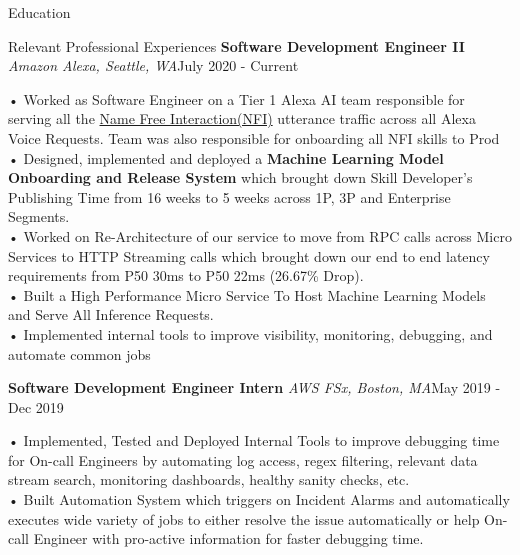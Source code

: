 \documentclass{resume} %
\begin{document}
\begin{rSection}{Education}
\begin{rSection}{Relevant Professional Experiences}
\textbf{Software Development Engineer II } \textit{Amazon Alexa, Seattle, WA}\hfill July 2020 - Current \\
\vspace{-1.7em} \begin{addmargin}[0.5em]{0em}
• Worked as Software Engineer on a Tier 1 Alexa AI team responsible for serving all the \href{https://developer.amazon.com/en-US/docs/alexa/custom-skills/understand-name-free-interaction-for-custom-skills.html}{Name Free Interaction(NFI)} utterance traffic across all Alexa Voice Requests. Team was also responsible for onboarding all NFI skills to Prod\\
• Designed, implemented and deployed a \textbf{Machine Learning Model Onboarding and Release System} which brought down Skill Developer's Publishing Time from 16 weeks to 5 weeks across 1P, 3P and Enterprise Segments. \\
• Worked on Re-Architecture of our service to move from RPC calls across Micro Services to HTTP Streaming calls which brought down our end to end latency requirements from P50 30ms to P50 22ms (26.67\% Drop).\\
• Built a High Performance Micro Service To Host Machine Learning Models and Serve All Inference Requests. \\
• Implemented internal tools to improve visibility, monitoring, debugging, and automate common jobs \\
\end{addmargin} \vspace{-1.7em}
\textbf{Software Development Engineer Intern } \textit{AWS FSx, Boston, MA}\hfill May 2019 - Dec 2019 \\
\vspace{-1.7em} \begin{addmargin}[0.5em]{0em}
• Implemented, Tested and Deployed Internal Tools to improve debugging time for On-call Engineers by automating log access, regex filtering, relevant data stream search, monitoring dashboards, healthy sanity checks, etc. \\
• Built Automation System which triggers on Incident Alarms and automatically executes wide variety of jobs to either resolve the issue automatically or help On-call Engineer with pro-active information for faster debugging time. \\

\end{addmargin}
\end{rSection}
\end{rSection}
\end{document}
